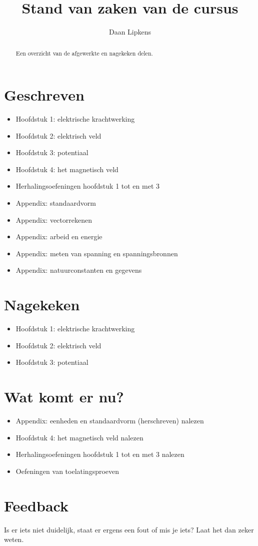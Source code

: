 \documentclass{ximera}
\title{Stand van zaken van de cursus}
\author{Daan Lipkens}
\begin{document}
\begin{abstract}
    Een overzicht van de afgewerkte en nagekeken delen.
\end{abstract}
\maketitle

\section*{Geschreven}
\begin{itemize}
    \item Hoofdstuk 1: elektrische krachtwerking
    \item Hoofdstuk 2: elektrisch veld
    \item Hoofdstuk 3: potentiaal
    \item Hoofdstuk 4: het magnetisch veld
    \item Herhalingsoefeningen hoofdstuk 1 tot en met 3
    \item Appendix: standaardvorm
    \item Appendix: vectorrekenen
    \item Appendix: arbeid en energie
    \item Appendix: meten van spanning en spanningsbronnen
    \item Appendix: natuurconstanten en gegevens
\end{itemize}

\section*{Nagekeken}
\begin{itemize}
    \item Hoofdstuk 1: elektrische krachtwerking
    \item Hoofdstuk 2: elektrisch veld
    \item Hoofdstuk 3: potentiaal
\end{itemize}

\section*{Wat komt er nu?}
\begin{itemize}
    \item Appendix: eenheden en standaardvorm (herschreven) nalezen
    \item Hoofdstuk 4: het magnetisch veld nalezen
    \item Herhalingsoefeningen hoofdstuk 1 tot en met 3 nalezen
    \item Oefeningen van toelatingsproeven
\end{itemize}

\section*{Feedback}
Is er iets niet duidelijk, staat er ergens een fout of mis je iets? Laat het dan zeker weten.
\end{document}
